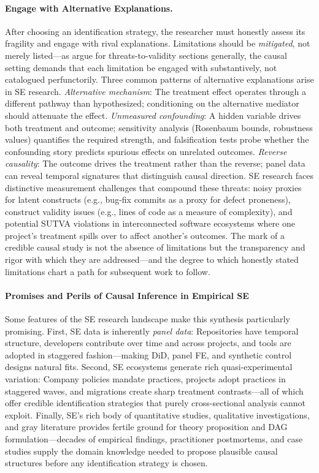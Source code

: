 \paragraph{Engage with Alternative Explanations.}
\label{sec:guide-credibility}
After choosing an identification strategy, the researcher must honestly assess its fragility and engage with rival explanations.
Limitations should be \emph{mitigated}, not merely listed---as \citet{DBLP:journals/tosem/RobillardAEGLNNSSS24} argue for threats-to-validity sections generally, the causal setting demands that each limitation be engaged with substantively, not catalogued perfunctorily.
Three common patterns of alternative explanations arise in SE research.
\emph{Alternative mechanism}: The treatment effect operates through a different pathway than hypothesized; conditioning on the alternative mediator should attenuate the effect.
\emph{Unmeasured confounding}: A hidden variable drives both treatment and outcome; sensitivity analysis (Rosenbaum bounds, robustness values) quantifies the required strength, and falsification tests probe whether the confounding story predicts spurious effects on unrelated outcomes.
\emph{Reverse causality}: The outcome drives the treatment rather than the reverse; panel data can reveal temporal signatures that distinguish causal direction.
SE research faces distinctive measurement challenges that compound these threats: noisy proxies for latent constructs (e.g., bug-fix commits as a proxy for defect proneness), construct validity issues (e.g., lines of code as a measure of complexity), and potential SUTVA violations in interconnected software ecosystems where one project's treatment spills over to affect another's outcomes.
The mark of a credible causal study is not the absence of limitations but the transparency and rigor with which they are addressed---and the degree to which honestly stated limitations chart a path for subsequent work to follow.

\paragraph{Promises and Perils of Causal Inference in Empirical SE}
Some features of the SE research landscape make this synthesis particularly promising.
First, SE data is inherently \emph{panel data}: Repositories have temporal structure, developers contribute over time and across projects, and tools are adopted in staggered fashion---making DiD, panel FE, and synthetic control designs natural fits.
Second, SE ecosystems generate rich quasi-experimental variation: Company policies mandate practices, projects adopt practices in staggered waves, and migrations create sharp treatment contrasts---all of which offer credible identification strategies that purely cross-sectional analysis cannot exploit.
Finally, SE's rich body of quantitative studies, qualitative investigations, and gray literature provides fertile ground for theory proposition and DAG formulation---decades of empirical findings, practitioner postmortems, and case studies supply the domain knowledge needed to propose plausible causal structures before any identification strategy is chosen.

